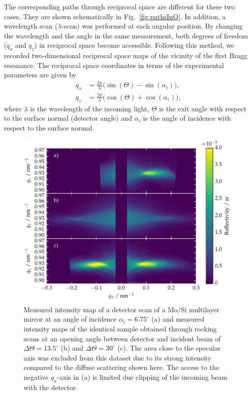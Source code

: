The corresponding paths through reciprocal space are different for these two cases. They are shown schematically in Fig.~\ref{fig:pathsInQ}. In addition, a wavelength scan ($\lambda$-scan) was performed at each angular position. By changing the wavelength and the angle in the same measurement, both degrees of freedom ($q_x$ and $q_z$) in reciprocal space become accessible. Following this method, we recorded two-dimensional reciprocal space maps of the vicinity of the first Bragg resonance. The reciprocal space coordinates in terms of the experimental parameters are given by 
\begin{align}
	q_x &= \frac{2 \pi}{\lambda} \big(\sin(\Theta) - \sin(\alpha_i)\big) \text{,}\\
	q_z &= \frac{2\pi}{\lambda} \big(\cos(\Theta) + \cos(\alpha_i)\big) \text{,} 
\end{align}
where $\lambda$ is the wavelength of the incoming light, $\Theta$ is the exit angle with respect to the surface normal (detector angle) and $\alpha_i$ is the angle of incidence with respect to the surface normal.

\begin{figure}[htbp]
        \includegraphics[width=
        \textwidth]{img/PTB17_diffuse_scattering_multiple_geometries} \caption{Measured intensity map of a detector scan of a Mo/Si multilayer mirror at an angle of incidence $\alpha_i = 6.75^\circ$ (a) and  measured intensity maps of the identical sample obtained through rocking scans at an opening angle between detector and incident beam of $\Delta \Theta = 13.5^\circ$ (b) and $\Delta \Theta = 30^\circ$ (c). The area close to the specular axis was excluded from this dataset due to its strong intensity compared to the diffuse scattering shown here. The access to the negative $q_x$-axis in (a) is limited due clipping of the incoming beam with the detector.} \label{fig:comparison} 
\end{figure}

